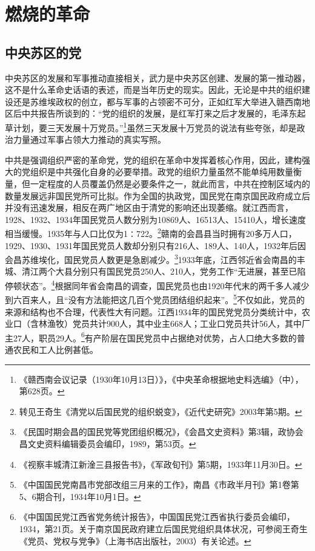 \chapter{燃烧的革命}

\section{中央苏区的党}


中央苏区的发展和军事推动直接相关，武力是中央苏区创建、发展的第一推动器，这不是什么革命史话语的表述，而是当年历史的现实。因此，无论是中共的组织建设还是苏维埃政权的创立，都与军事的占领密不可分，正如红军大举进入赣西南地区后中共报告所谈到的：“党的组织的发展，是红军打来之后才发展的，毛泽东起草计划，要三天发展十万党员。”\footnote{《赣西南会议记录（1930年10月13日）》，《中央革命根据地史料选编》（中），第628页。}虽然三天发展十万党员的说法有些夸张，却是政治力量通过军事占领大力推动的真实写照。


中共是强调组织严密的革命党，党的组织在革命中发挥着核心作用，因此，建构强大的党组织是中共强化自身的必要举措。政党的组织力量虽然不能单纯用数量衡量，但一定程度的人员覆盖仍然是必要条件之一，就此而言，中共在控制区域内的数量发展远非国民党所可比拟。作为全国的执政党，国民党在南京国民政府成立后并没有迅速发展，相反在两广地区由于清党的影响还出现萎缩。就江西而言，1928、1932、1934年国民党员人数分别为10869人、16513人、15410人，增长速度相当缓慢。1935年与人口比仅为1∶722。\footnote{转见王奇生《清党以后国民党的组织蜕变》，《近代史研究》2003年第5期。}赣南的会昌县当时拥有20多万人口，1929、1930、1931年国民党员人数却分别只有216人、189人、140人，1932年后因会昌苏维埃化，国民党员人数更是急剧减少。\footnote{《民国时期会昌的国民党等党团组织概况》，《会昌文史资料》第3辑，政协会昌文史资料编辑委员会编印，1989，第53页。}1933年底，江西邻近省会南昌的丰城、清江两个大县分别只有国民党员250人、210人，党务工作“无进展，甚至已陷停顿状态”。\footnote{《视察丰城清江新淦三县报告书》，《军政旬刊》第5期，1933年11月30日。}根据同年省会南昌的调查，国民党员也由1920年代末的两千多人减少到六百来人，且“没有方法能把这几百个党员团结组织起来”。\footnote{《中国国民党南昌市党部改组三月来的工作》，南昌《市政半月刊》第1卷第5、6期合刊，1934年10月1日。}不仅如此，党员的来源和结构也不合理，代表性大有问题。江西1934年的国民党党员分类统计中，农业口（含林渔牧）党员共计900人，其中业主668人；工业口党员共计56人，其中厂主27人，职员29人。\footnote{《中国国民党江西省党务统计报告》，中国国民党江西省执行委员会编印，1934，第21页。关于南京国民政府建立后国民党组织具体状况，可参阅王奇生《党员、党权与党争》（上海书店出版社，2003）有关论述。}有产阶层在国民党员中占据绝对优势，占人口绝大多数的普通农民和工人比例甚低。


